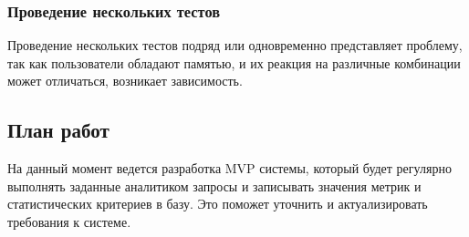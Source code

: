 \documentclass[../document.tex]{subfiles}
\begin{document}
    \subsubsection{Проведение нескольких тестов}
    Проведение нескольких тестов подряд или одновременно представляет проблему, так как пользователи обладают памятью, и их реакция на различные комбинации может отличаться, возникает зависимость.
    \subsection{План работ}
    На данный момент ведется разработка MVP системы, который будет регулярно выполнять заданные аналитиком запросы и записывать значения метрик и статистических критериев в базу. Это поможет уточнить и актуализировать требования к системе.
\end{document}

